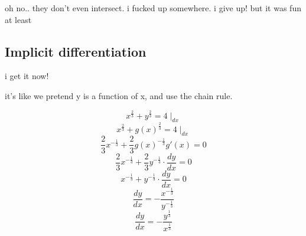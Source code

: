 \documentclass{article}
\begin{document}
  oh no.. they don't even intersect. i fucked up somewhere. i give up! but it was fun at least

  \subsection{Implicit differentiation}
  i get it now!

  it's like we pretend y is a function of x, and use the chain rule.

  \[
    x^\frac{2}{3} + y^\frac{2}{3} = 4 \mid_{dx}
  \]
  \[
    x^\frac{2}{3} + g(x)^\frac{2}{3} = 4 \mid_{dx}
  \]
  \[
    \frac{2}{3}x^{-\frac{1}{3}} + \frac{2}{3}g(x)^{-\frac{1}{3}}g'(x) = 0
  \]
  \[
    \frac{2}{3}x^{-\frac{1}{3}} + \frac{2}{3}y^{-\frac{1}{3}}\cdot \frac{dy}{dx} = 0
  \]
  \[
    x^{-\frac{1}{3}} + y^{-\frac{1}{3}}\cdot \frac{dy}{dx} = 0
  \]
  \[
    \frac{dy}{dx} = -\frac{x^{-\frac{1}{3}}}{y^{-\frac{1}{3}}}
  \]
  \[
    \frac{dy}{dx} = -\frac{y^{\frac{1}{3}}}{x^{\frac{1}{3}}}
  \]
\end{document}
